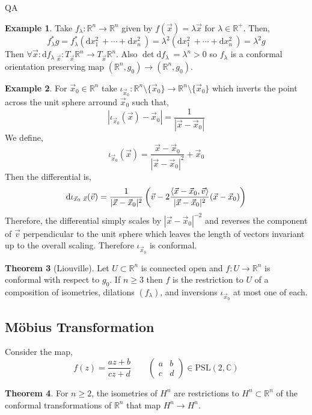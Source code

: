 QA	 \documentclass[12pt]{extarticle}
\newcommand{\R}{\mathbb{R}}
\renewcommand{\d}[1]{ \mathrm{d}#1 \:}
\theoremstyle{definition}
\newtheorem{theorem}{Theorem}[section]
\newtheorem{example}[theorem]{Example}
\newcommand{\PSL}[1]{\mathrm{PSL}\left(#1\right)}
\begin{document}
\begin{example}
Take $f_\lambda : \R^n \to \R^n$ given by $f(\vec{x}) = \lambda \vec{x}$ for $\lambda \in \R^+$. Then,
\[ f^*_\lambda g = f^*_\lambda (\d{x_1^2} + \cdots + \d{x_n^2}) = \lambda^2 (\d{x_1^2} + \cdots + \d{x_n^2}) = \lambda^2 g \]
Then $\forall \vec{x} : \d{f_\lambda}_{\vec{x}} : T_{\vec{x}} \R^n \to T_{\vec{x}} \R^n$. Also $\det{\d{f_\lambda}} = \lambda^n > 0$ so $f_\lambda$ is a conformal orientation preserving map $(\R^n, g_0) \to (\R^n, g_0)$.
\end{example}

\begin{example}
For $\vec{x}_0 \in \R^n$ take $\iota_{\vec{x}_0} : \R^n \setminus \{\vec{x}_0\} \to \R^n \setminus \{ \vec{x}_0 \}$ which inverts the point across the unit sphere arround $\vec{x}_0$ such that,
\[ |\iota_{\vec{x}_0}(\vec{x}) - \vec{x}_0| = \frac{1}{|\vec{x} - \vec{x}_0|} \]
We define,
\[ \iota_{\vec{x}_0}(\vec{x}) = \frac{\vec{x} - \vec{x}_0}{|\vec{x} - \vec{x}_0|^2} + \vec{x}_0 \]
Then the differential is,
\[ \d{\iota_{\vec{x}_0}}_{\vec{x}}(\vec{v}) = \frac{1}{|\vec{x} - \vec{x}_0|^2} \left( \vec{v} - 2 \frac{\inner{\vec{x} - \vec{x}_0}{\vec{v}}}{|\vec{x} - \vec{x}_0|^2} (\vec{x} - \vec{x}_0) \right) \]
Therefore, the differential simply scales by $|\vec{x} - \vec{x}_0|^{-2}$ and reverses the component of $\vec{v}$ perpendicular to the unit sphere which leaves the length of vectors invariant up to the overall scaling. Therefore $\iota_{\vec{x}_0}$ is conformal. 
\end{example}

\begin{theorem}[Liouville]
Let $U \subset \R^n$ is connected open and $f : U \to \R^n$ is conformal with respect to $g_0$. If $n \ge 3$ then $f$ is the restriction to $U$ of a composition of isometries, dilations $(f_\lambda)$, and inversions $\iota_{\vec{x}_0}$ at most one of each.
\end{theorem}

\subsection{M\"{o}bius Transformation}

Consider the map,
\[ f(z) = \frac{az + b}{cz + d} \quad \quad 
\begin{pmatrix}
a & b
\\
c & d
\end{pmatrix}
\in \PSL{2, \mathbb{C}} \]


\begin{theorem}
For $n \ge 2$, the isometries of $H^n$ are restrictions to $H^n \subset \R^n$ of the conformal transformations of $\R^{n}$ that map $H^n \to H^n$. 
\end{theorem}
\end{document}
